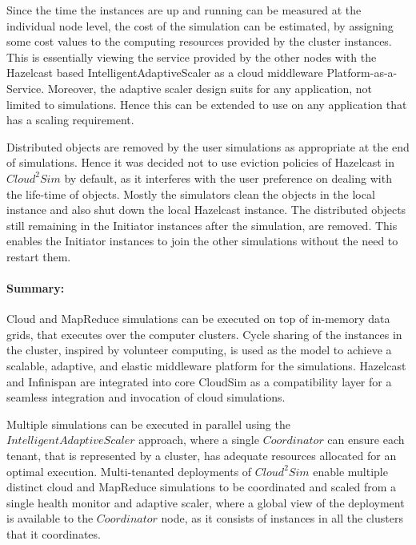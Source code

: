Since the time the instances are up and running can be measured at the individual node level, the cost of the simulation can be estimated, by assigning some cost values to the computing resources provided by the cluster instances. This is essentially viewing the service provided by the other nodes with the Hazelcast based IntelligentAdaptiveScaler as a cloud middleware Platform-as-a-Service. Moreover, the adaptive scaler design suits for any application, not limited to simulations. Hence this can be extended to use on any application that has a scaling requirement.

Distributed objects are removed by the user simulations as appropriate at the end of simulations. Hence it was decided not to use eviction policies of Hazelcast in $Cloud^{2}Sim$ by default, as it interferes with the user preference on dealing with the life-time of objects. Mostly the simulators clean the objects in the local instance and also shut down the local Hazelcast instance. The distributed objects still remaining in the Initiator instances after the simulation, are removed. This enables the Initiator instances to join the other simulations without the need to restart them.

\paragraph*{Summary:}
Cloud and MapReduce simulations can be executed on top of in-memory data grids, that executes over the computer clusters. Cycle sharing of the instances in the cluster, inspired by volunteer computing, is used as the model to achieve a scalable, adaptive, and elastic middleware platform for the simulations. Hazelcast and Infinispan are integrated into core CloudSim as a compatibility layer for a seamless integration and invocation of cloud simulations.

Multiple simulations can be executed in parallel using the $IntelligentAdaptiveScaler$ approach, where a single $Coordinator$ can ensure each tenant, that is represented by a cluster, has adequate resources allocated for an optimal execution. Multi-tenanted deployments of $Cloud^{2}Sim$ enable multiple distinct cloud and MapReduce simulations to be coordinated and scaled from a single health monitor and adaptive scaler, where a global view of the deployment is available to the $Coordinator$ node, as it consists of instances in all the clusters that it coordinates.
